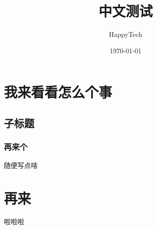 \documentclass[a4paper]{article}
\author{HappyTech}
\date{\today}
\title{中文测试}
\begin{document}
\maketitle
\tableofcontents


\section{我来看看怎么个事}
\label{sec:org1bbf566}

\subsection{子标题}
\label{sec:org05c8006}

\subsubsection{再来个}
\label{sec:org0a63a86}

随便写点啥

\section{再来}
\label{sec:org37b80e2}

啦啦啦
\end{document}
